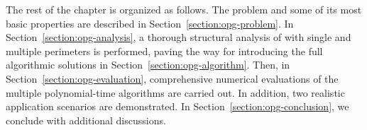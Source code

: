 
The rest of the chapter is organized as follows. 
%
The \opg problem and some of its most basic properties are described 
in Section~\ref{section:opg-problem}. 
%
In Section~\ref{section:opg-analysis}, a thorough structural analysis of \opg 
with single and multiple perimeters is performed, paving the way for 
introducing the full algorithmic solutions in Section~\ref{section:opg-algorithm}.
%
Then, in Section~\ref{section:opg-evaluation}, comprehensive numerical 
evaluations of the multiple polynomial-time algorithms are carried out. 
In addition, two realistic application scenarios are demonstrated. 
%
In Section~\ref{section:opg-conclusion}, we conclude with  
additional discussions. 
